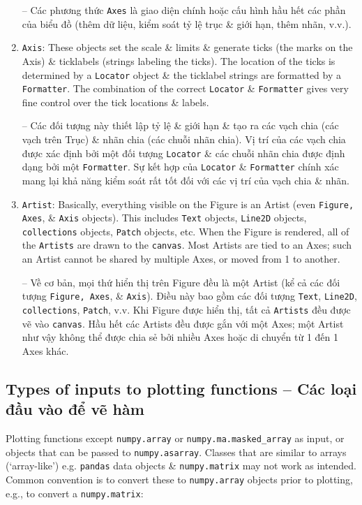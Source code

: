 \documentclass{article}
\begin{document}
\begin{enumerate}
    -- Các phương thức {\tt Axes} là giao diện chính hoặc cấu hình hầu hết các phần của biểu đồ (thêm dữ liệu, kiểm soát tỷ lệ trục \& giới hạn, thêm nhãn, v.v.).
    \item {\tt Axis}: These objects set the scale \& limits \& generate ticks (the marks on the Axis) \& ticklabels (strings labeling the ticks). The location of the ticks is determined by a {\tt Locator} object \& the ticklabel strings are formatted by a {\tt Formatter}. The combination of the correct {\tt Locator} \& {\tt Formatter} gives very fine control over the tick locations \& labels.
    
    -- Các đối tượng này thiết lập tỷ lệ \& giới hạn \& tạo ra các vạch chia (các vạch trên Trục) \& nhãn chia (các chuỗi nhãn chia). Vị trí của các vạch chia được xác định bởi một đối tượng {\tt Locator} \& các chuỗi nhãn chia được định dạng bởi một {\tt Formatter}. Sự kết hợp của {\tt Locator} \& {\tt Formatter} chính xác mang lại khả năng kiểm soát rất tốt đối với các vị trí của vạch chia \& nhãn.
    \item {\tt Artist}: Basically, everything visible on the Figure is an Artist (even {\tt Figure, Axes}, \& {\tt Axis} objects). This includes {\tt Text} objects, {\tt Line2D} objects, {\tt collections} objects, {\tt Patch} objects, etc. When the Figure is rendered, all of the {\tt Artists} are drawn to the {\tt canvas}. Most Artists are tied to an Axes; such an Artist cannot be shared by multiple Axes, or moved from 1 to another.
    
    -- Về cơ bản, mọi thứ hiển thị trên Figure đều là một Artist (kể cả các đối tượng {\tt Figure, Axes}, \& {\tt Axis}). Điều này bao gồm các đối tượng {\tt Text}, {\tt Line2D}, {\tt collections}, {\tt Patch}, v.v. Khi Figure được hiển thị, tất cả {\tt Artists} đều được vẽ vào {\tt canvas}. Hầu hết các Artists đều được gắn với một Axes; một Artist như vậy không thể được chia sẻ bởi nhiều Axes hoặc di chuyển từ 1 đến 1 Axes khác.
\end{enumerate}


\subsection{Types of inputs to plotting functions -- Các loại đầu vào để vẽ hàm}
Plotting functions except {\tt numpy.array} or \verb|numpy.ma.masked_array| as input, or objects that can be passed to {\tt numpy.asarray}. Classes that are similar to arrays (`array-like') e.g. {\tt pandas} data objects \& {\tt numpy.matrix} may not work as intended. Common convention is to convert these to {\tt numpy.array} objects prior to plotting, e.g., to convert a {\tt numpy.matrix}:
\end{document}
